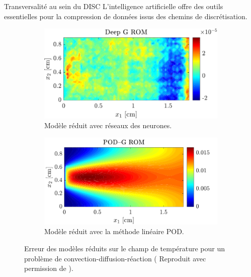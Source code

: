 \documentclass[aspectratio=169, french]{ISAE-Beamer}
\begin{document}
\begin{frame}{Transversalité au sein du DISC}
	L'intelligence artificielle offre des outils essentielles pour la compression de données issus des chemins de discrétisation.
	
	\begin{figure}[t]
		\begin{subfigure}[t]{0.48\textwidth}
			\includegraphics[width=\columnwidth]{DGROM_T_param1.pdf} 
			\caption*{Modèle réduit avec réseaux des neurones.}
		\end{subfigure}\hfill
		\begin{subfigure}[t]{0.48\textwidth}
			\includegraphics[width=\columnwidth]{GROM_T_param1.pdf}%
			\caption*{Modèle réduit avec la méthode linéaire POD.}
			\label{fig:POD_ROM}
		\end{subfigure}
		\caption*{Erreur des modèles réduits sur le champ de température pour un problème de convection-diffusion-réaction (
		Reproduit avec permission de \cite{lee2020}).}%
		\label{fig:deepROM}%
	\end{figure}
\end{frame}
\end{document}
